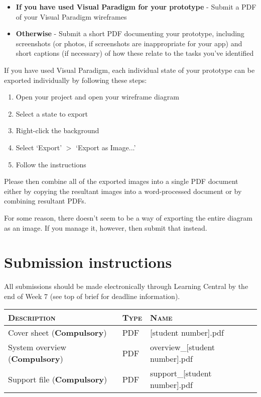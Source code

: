 \documentclass[11pt,a4paper]{report}
\begin{document}
\vskip10pt
\begin{itemize}
    \item \textbf{If you have used Visual Paradigm for your prototype} - Submit a PDF of your Visual Paradigm wireframes 
    \item \textbf{Otherwise} - Submit a short PDF documenting your prototype, including screenshots (or photos, if screenshots are inappropriate for your app) and short captions (if necessary) of how these relate to the tasks you've identified
\end{itemize}

If you have used Visual Paradigm, each individual state of your prototype can be exported individually by following these steps:
\begin{enumerate}
    \item Open your project and open your wireframe diagram
    \item Select a state to export
    \item Right-click the background 
    \item Select `Export' $>$ `Export as Image...'
    \item Follow the instructions 
\end{enumerate}

Please then combine all of the exported images into a single PDF document either by copying the resultant images into a word-processed document or by combining resultant PDFs.

For some reason, there doesn't seem to be a way of exporting the entire diagram as an image. If you manage it, however, then submit that instead.

\section*{Submission instructions}
All submissions should be made electronically through Learning Central by the end of Week 7 (see top of brief for deadline information).
\\
\begin{tabular}{| l | l | l |}
    \hline
    \textsc{Description} & \textsc{Type} & \textsc{Name} \\
    \hline
    Cover sheet (\textbf{Compulsory}) & PDF & [student number].pdf \\
    System overview (\textbf{Compulsory}) & PDF & overview\_[student number].pdf \\ 
    Support file (\textbf{Compulsory}) & PDF & support\_[student number].pdf\\
    \hline
\end{tabular}
\end{document}
